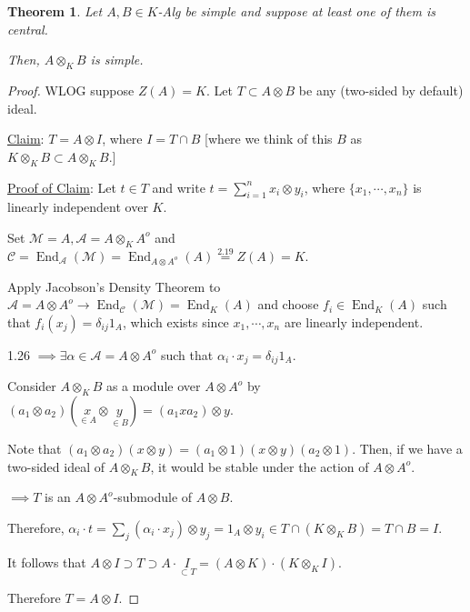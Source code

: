 \documentclass{article}
\theoremstyle{definition}
\theoremstyle{plain}
\newtheorem{theorem}{Theorem}[section]
\theoremstyle{remark}
\begin{document}
    \begin{theorem}
        Let \(A,B \in K\)-Alg be simple and suppose at least one of them is central.

        Then, \(A \otimes_K B\) is simple.
    \end{theorem}

    \begin{proof}
        WLOG suppose \(Z(A) = K\). Let \(T \subset A \otimes B\) be any (two-sided by default) ideal.

        \underline{Claim}: \(T = A \otimes I\), where \(I = T \cap B\) [where we think of this \(B\) as \(K \otimes_K B \subset A \otimes_K B\).]

        \underline{Proof of Claim}: Let \(t\in T\) and write \(t = \sum_{i=1}^n x_i \otimes y_i\), where \(\{ x_1, \cdots , x_n \} \) is linearly independent over \(K\).

        Set \(\mathscr{M} = A, \mathscr{A} = A \otimes_K A^o\) and \(\mathscr{C} = \operatorname{End}_{\mathscr{A}} (\mathscr{M}) = \operatorname{End}_{A \otimes A^o}(A) \overset{2.19}{=} Z(A)= K\).

        Apply Jacobson's Density Theorem to \(\mathscr{A} = A \otimes A^o \to \operatorname{End}_{\mathscr{C}}(\mathscr{M}) = \operatorname{End}_K (A)\) and choose \(f_i \in \operatorname{End}_K(A)\) such that \(f_i(x_j) = \delta_{ij} 1_A\), which exists since \(x_1, \cdots , x_n\) are linearly independent.

        1.26 \(\implies \exists \alpha \in \mathscr{A} = A \otimes A^o\) such that \(\alpha_i \cdot x_j = \delta_{ij}1_A\).

        Consider \(A \otimes_K B\) as a module over \(A \otimes A^o\) by \((a_1 \otimes a_2) (\underset{\in A}{x} \otimes \underset{\in B}{y})= (a_1 x a_2) \otimes y\).
        
        Note that \((a_1 \otimes a_2)(x \otimes y) = (a_1 \otimes 1) (x \otimes y) (a_2 \otimes 1)\). Then, if we have a two-sided ideal of \(A \otimes_K B\), it would be stable under the action of \(A \otimes A^o\).

        \(\implies T\) is an \(A \otimes A^o\)-submodule of \(A \otimes B\).
        
        Therefore, \(\alpha_i \cdot t = \sum_{j} (\alpha_i \cdot x_j) \otimes y_j = 1_A \otimes y_i \in T \cap (K \otimes_K B) = T \cap B = I\).

        It follows that \(A \otimes I \supset T \supset A \cdot \underset{\subset T}{I}  = (A \otimes K) \cdot (K \otimes_K I)\). 

        Therefore \(T = A \otimes I\).

    \end{proof}
\end{document}
